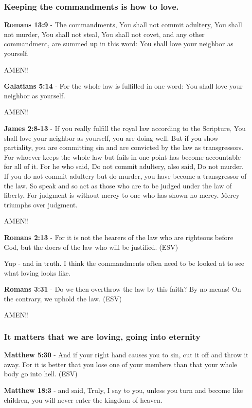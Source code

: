 \documentclass[11pt]{article}
\begin{document}
\subsubsection{Keeping the commandments is how to love.}
\label{sec:org17e0c2e}

\textbf{Romans 13:9} - The commandments, You shall not commit adultery, You shall not murder, You shall not steal, You shall not covet, and any other commandment, are summed up in this word: You shall love your neighbor as yourself.

AMEN!!

\textbf{Galatians 5:14} - For the whole law is fulfilled in one word: You shall love your neighbor as yourself.

AMEN!!

\textbf{James 2:8-13} - If you really fulfill the royal law according to the Scripture, You shall love your neighbor as yourself, you are doing well. But if you show partiality, you are committing sin and are convicted by the law as transgressors. For whoever keeps the whole law but fails in one point has become accountable for all of it. For he who said, Do not commit adultery, also said, Do not murder. If you do not commit adultery but do murder, you have become a transgressor of the law. So speak and so act as those who are to be judged under the law of liberty. For judgment is without mercy to one who has shown no mercy. Mercy triumphs over judgment.

AMEN!!

\textbf{Romans 2:13} - For it is not the hearers of the law who are righteous before God, but the doers of the law who will be justified. (ESV)

Yup - and in truth. I think the commandments often need to be looked at to see what loving looks like.

\textbf{Romans 3:31} - Do we then overthrow the law by this faith? By no means! On the contrary, we uphold the law. (ESV)

AMEN!!

\subsubsection{It matters that we are loving, going into eternity}
\label{sec:orgb8553fa}
\textbf{Matthew 5:30} - And if your right hand causes you to sin, cut it off and throw it away. For it is better that you lose one of your members than that your whole body go into hell. (ESV)

\textbf{Matthew 18:3} - and said, Truly, I say to you, unless you turn and become like children, you will never enter the kingdom of heaven.
\end{document}

